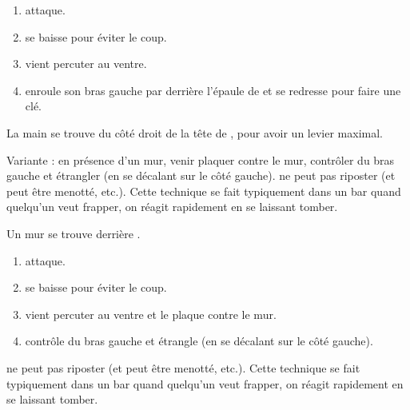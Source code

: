 \begin{technique}

\begin{enumerate}
	\item \A attaque.
	
	\item \D se baisse pour éviter le coup.
	
	\item \D vient percuter \A au ventre.
	
	\item \D enroule son bras gauche par derrière l'épaule de \A et se redresse pour faire une clé.
\end{enumerate}

La main se trouve du côté droit de la tête de \A, pour avoir un levier maximal.

Variante : en présence d'un mur, venir plaquer \A contre le mur, contrôler du bras gauche et étrangler (en se décalant sur le côté gauche).
\A ne peut pas riposter (et peut être menotté, etc.).
Cette technique se fait typiquement dans un bar quand quelqu'un veut frapper, on réagit rapidement en se laissant tomber.

\end{technique}


\begin{technique}

Un mur se trouve derrière \A.

\begin{enumerate}
	\item \A attaque.
	
	\item \D se baisse pour éviter le coup.
	
	\item \D vient percuter \A au ventre et le plaque contre le mur.
	
	\item \D contrôle du bras gauche et étrangle (en se décalant sur le côté gauche).
\end{enumerate}

\A ne peut pas riposter (et peut être menotté, etc.).
Cette technique se fait typiquement dans un bar quand quelqu'un veut frapper, on réagit rapidement en se laissant tomber.

\end{technique}


